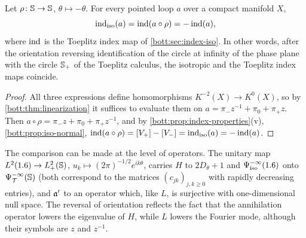 \begin{proposition}\label{bott:prop:iso-toeplitz}
  Let $\rho\colon\mathbb{S}\to\mathbb{S}$, $\theta\mapsto-\theta$. For every pointed loop $a$ over
  a compact manifold $X$,
  \begin{equation*}
    \operatorname{ind}_{\mathrm{iso}}(a)=\operatorname{ind}(a\circ\rho)=-\operatorname{ind}(a),
  \end{equation*}
  where $\operatorname{ind}$ is the Toeplitz index map of \cref{bott:sec:index-iso}. In other words,
  after the orientation reversing identification of the circle at infinity of the phase
  plane with the circle $\mathbb{S}_+$ of the Toeplitz calculus, the isotropic and the Toeplitz
  index maps coincide.
\end{proposition}
\begin{proof}
  All three expressions define homomorphisms $K^{-2}(X)\to K^0(X)$, so by
  \cref{bott:thm:linearization} it suffices to evaluate them on
  $a=\pi_-z^{-1}+\pi_0+\pi_+z$. Then $a\circ\rho=\pi_-z+\pi_0+\pi_+z^{-1}$, and by
  \cref{bott:prop:index-properties}(v), \cref{bott:prop:iso-normal},
  $\operatorname{ind}(a\circ\rho)=[V_+]-[V_-]=\operatorname{ind}_{\mathrm{iso}}(a)=-\operatorname{ind}(a)$.
\end{proof}

\begin{remark}\label{bott:rem:iso-toeplitz-unitary}
  The comparison can be made at the level of operators. The unitary map
  $L^2(1.6)\to L^2_+(\mathbb{S})$, $u_k\mapsto(2\pi)^{-1/2}e^{ik\theta}$, carries $H$ to $2D_\theta+1$ and
  $\Psi^{-\infty}_{\mathrm{iso}}(1.6)$ onto $\Psi^{-\infty}_{\mathcal{T}}(\mathbb{S})$ (both correspond to the matrices
  $(c_{jk})_{j,k\ge0}$ with rapidly decreasing entries), and $\mathfrak{a}'$ to an operator
  which, like $L$, is surjective with one-dimensional null space. The reversal of
  orientation reflects the fact that the annihilation operator lowers the eigenvalue of
  $H$, while $L$ lowers the Fourier mode, although their symbols are $z$ and $z^{-1}$.
\end{remark}

